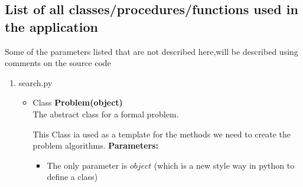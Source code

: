 \documentclass{article}
\begin{document}
\subsection{List of all classes/procedures/functions used in the application}
\par Some of the parameters listed that are not described here,will be described using comments on the source code
\begin{enumerate}
    \item search.py
   \begin{itemize}
       \item Class \textbf{Problem(object)}\\
       The abstract class for a formal problem.
       \par This Class ia used as a template for the methods we need to create the problem algorithms.
       \textbf {Parameters:}
       
       \begin{itemize}
           \item The only  parameter is \textbf{$object$}
           (which is a new style way in python to define a class)
          

\end{itemize}
\end{itemize}
\end{enumerate}
\end{document}
